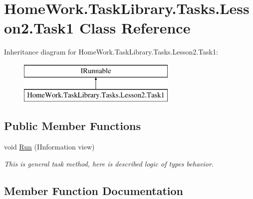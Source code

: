 \hypertarget{class_home_work_1_1_task_library_1_1_tasks_1_1_lesson2_1_1_task1}{}\section{Home\+Work.\+Task\+Library.\+Tasks.\+Lesson2.\+Task1 Class Reference}
\label{class_home_work_1_1_task_library_1_1_tasks_1_1_lesson2_1_1_task1}
Inheritance diagram for Home\+Work.\+Task\+Library.\+Tasks.\+Lesson2.\+Task1\+:\begin{figure}[H]
\begin{center}
\leavevmode
\includegraphics[height=2.000000cm]{class_home_work_1_1_task_library_1_1_tasks_1_1_lesson2_1_1_task1}
\end{center}
\end{figure}
\subsection*{Public Member Functions}
\begin{DoxyCompactItemize}
\item 
void \mbox{\hyperlink{class_home_work_1_1_task_library_1_1_tasks_1_1_lesson2_1_1_task1_a2a30bfd029dc146e3e28ec4cb1af58fb}{Run}} (I\+Information view)
\begin{DoxyCompactList}\small\item\em This is general task method, here is described logic of types behavior. \end{DoxyCompactList}\end{DoxyCompactItemize}


\subsection{Member Function Documentation}
\mbox{\label{class_home_work_1_1_task_library_1_1_tasks_1_1_lesson2_1_1_task1_a2a30bfd029dc146e3e28ec4cb1af58fb}} 
